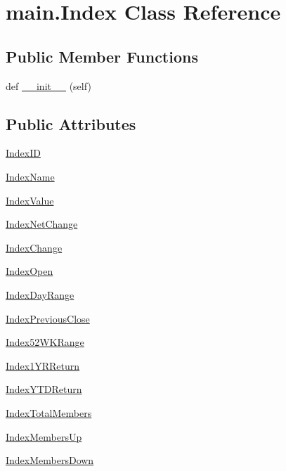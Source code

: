 \hypertarget{classmain_1_1_index}{}\section{main.\+Index Class Reference}
\label{classmain_1_1_index}
\subsection*{Public Member Functions}
\begin{DoxyCompactItemize}
\item 
def \hyperlink{classmain_1_1_index_a28f2e4be874d960e07941352bbd15b40}{\+\_\+\+\_\+init\+\_\+\+\_\+} (self)
\end{DoxyCompactItemize}
\subsection*{Public Attributes}
\begin{DoxyCompactItemize}
\item 
\hyperlink{classmain_1_1_index_a9ee702548e11874f28c2adced2097e7f}{Index\+I\+D}
\item 
\hyperlink{classmain_1_1_index_a835731dde9560a61f5efa31be3372db4}{Index\+Name}
\item 
\hyperlink{classmain_1_1_index_a0ed012594448b6c4c87efa3d6c9c2eb3}{Index\+Value}
\item 
\hyperlink{classmain_1_1_index_aca976dead65a48e0f2ef9006f0e30d75}{Index\+Net\+Change}
\item 
\hyperlink{classmain_1_1_index_a0789891667da9465d38fdb821293e6b0}{Index\+Change}
\item 
\hyperlink{classmain_1_1_index_aa9654e9f74cef74875eba72705112815}{Index\+Open}
\item 
\hyperlink{classmain_1_1_index_a55d7ddbeb364ec830e8d8394af19ac14}{Index\+Day\+Range}
\item 
\hyperlink{classmain_1_1_index_a36c2b8bf7d1f41111507777cefb56a02}{Index\+Previous\+Close}
\item 
\hyperlink{classmain_1_1_index_a83e2dce80856a53c59dd6905b16e0b75}{Index52\+W\+K\+Range}
\item 
\hyperlink{classmain_1_1_index_a762282aa5ef42d9b37d43248caa303d1}{Index1\+Y\+R\+Return}
\item 
\hyperlink{classmain_1_1_index_a1178add897f1f01b5add7150da939ba2}{Index\+Y\+T\+D\+Return}
\item 
\hyperlink{classmain_1_1_index_a83501b0761a15fa4a3ca1e39d107a5b8}{Index\+Total\+Members}
\item 
\hyperlink{classmain_1_1_index_a30b9d8cd97f5664a633f0c655ce27157}{Index\+Members\+Up}
\item 
\hyperlink{classmain_1_1_index_afe542cfd91185d23bebc8beda744d917}{Index\+Members\+Down}
\end{DoxyCompactItemize}


